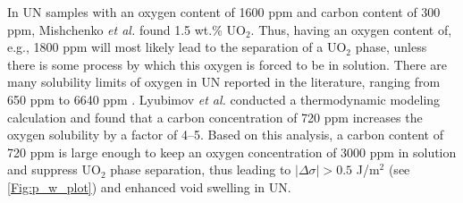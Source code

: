 \documentclass[preprint,12pt,sort&compress]{elsarticle}
\newcommand{\?}{\stackrel{?}{=}}
\begin{document}

In UN samples with an oxygen content of 1600 ppm and carbon content of 300 ppm, Mishchenko \textit{et al.} \cite{Mishchenko2021} found 1.5 wt.\% UO$_2$. Thus, having an oxygen content of, e.g., 1800 ppm will most likely lead to the separation of a UO$_2$ phase, unless there is some process by which this oxygen is forced to be in solution. There are many solubility limits of oxygen in UN reported in the literature, ranging from 650 ppm to 6640 ppm \cite{Javed1972,Jain1993,Konovalov2016,Jaques2015}. Lyubimov \textit{et al.} \cite{Lyubimov2014} conducted a thermodynamic modeling calculation and found that a carbon concentration of 720 ppm increases the oxygen solubility by a factor of 4--5. Based on this analysis, a carbon content of 720 ppm is large enough to keep an oxygen concentration of 3000 ppm in solution and suppress UO$_2$ phase separation, thus leading to $|\Delta \sigma| > 0.5$ J/m$^2$ (see \cref{Fig:p_w_plot}) and enhanced void swelling in UN.
\end{document}

